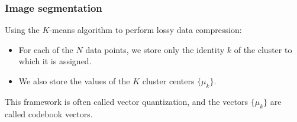 \documentclass{beamer}
\begin{document}
\begin{frame}
    \frametitle{Image segmentation}
    Using the $K$-means algorithm to perform lossy data compression:
    \begin{itemize}
        \item For each of the $N$ data points, we store only the identity $k$ of the cluster to which it is assigned.
        \item We also store the values of the $K$ cluster centers $\{\mu_{k}\}$.
    \end{itemize}
    This framework is often called vector quantization, and the vectors $\{\mu_{k}\}$ are called codebook vectors.
\end{frame}
\end{document}
